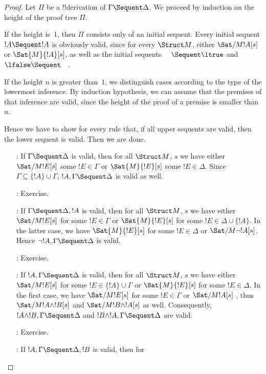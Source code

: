 \documentclass[../../../include/open-logic-section]{subfiles}
\begin{document}
\begin{proof}
Let $\Pi$ be a !!{derivation} of $\Gamma \Sequent \Delta$. We proceed by
induction on the height of the proof tree $\Pi$.

If the height is~1, then $\Pi$ consists only of an
initial sequent. Every initial sequent $!A \Sequent !A$ is obviously
valid, since for every $\Struct M$, either $\Sat/{M}{!A}[s]$ or
$\Sat{M}{!A}[s]$, as well as the initial sequents $\quad \Sequent \ltrue$
and $\lfalse \Sequent \quad$.

If the height $n$ is greater than~$1$, we distinguish cases
according to the type of the lowermost inference. By induction
hypothesis, we can assume that the premises of that inference are
valid, since the height of the proof of a premise is smaller than $n$.

Hence we have to show for every rule that, if all upper sequents are valid, 
then the lower sequent is valid. Then we are done.
\begin{enumerate}
\item[\LeftR{\Weakening}:] If $\Gamma \Sequent \Delta$ is valid, then for all 
$\Struct M$, $s$ we have either $\Sat/{M}{!E}[s]$ some $!E \in \Gamma$  or $
\Sat{M}{!E}[s]$ some $!E \in \Delta$. Since $\Gamma \subseteq \{!A\} \cup  
\Gamma$, $!A, \Gamma \Sequent \Delta$ is valid as well.
\item[\RightR{\Weakening}:] Exercise.
\item[\LeftR{\lnot}:] If $\Gamma \Sequent \Delta, !A$ is valid, then for all $
  \Struct M$, $s$ we have either $\Sat/{M}{!E}[s]$ for some $!E \in \Gamma$  
or $ \Sat{M}{!E}[s]$ for some $!E \in \Delta \cup \{!A\}$. In the latter 
case, we have $\Sat{M}{!E}[s]$ for some $ !E \in \Delta$ or $\Sat/{M}{\lnot !A
}[s]$. Hence $\lnot !A, \Gamma \Sequent \Delta$ is valid. 
\item[\RightR{\lnot}:] Exercise.
\item[\LeftR{\land}:] If $!A, \Gamma \Sequent \Delta$ is valid, then for all $
  \Struct M$, $s$  we have either $\Sat/{M}{!E}[s]$ for some $!E \in \{!A\} 
\cup \Gamma$  or $\Sat{M}{!E}[s]$ for some $!E \in \Delta$. In the first 
case, we have $\Sat/{M }{!E}[s]$ for some $!E \in \Gamma$ or $\Sat/{M}{!A}[s]$
, thus $\Sat/{M}{!A \land !B }[s]$ and $\Sat/{M}{!B \land !A}[s]$ as well. 
Consequently, $!A \land !B, \Gamma \Sequent \Delta$ and $!B \land !A, \Gamma 
\Sequent \Delta$ are valid.
\item[\RightR{\lor}:] Exercise.
\item[\RightR{\lif}:] If $!A, \Gamma \Sequent \Delta, !B$ is valid, then for 

\end{enumerate}
\end{proof}
\end{document}
